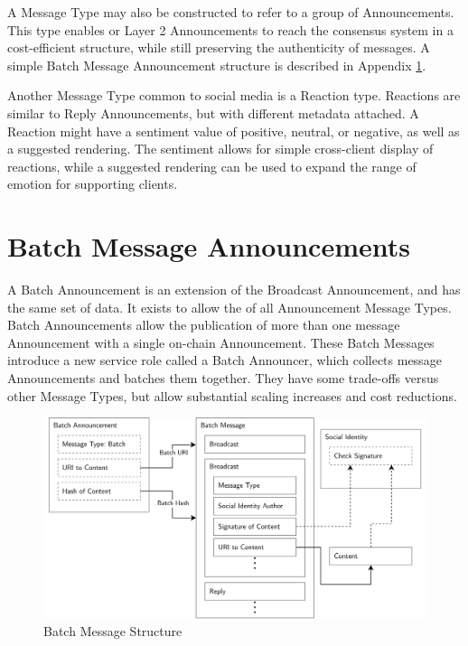 \documentclass[12pt,letterpaper]{article}
\begin{document}
A Message Type may also be constructed to refer to a group of Announcements. This type
enables  or Layer 2 Announcements to reach the consensus system in a
cost-efficient structure, while still preserving the authenticity of messages. A simple
Batch Message Announcement structure is described in Appendix
\ref{app:batch_message_announcements}.

Another Message Type common to social media is a Reaction type. Reactions are similar to
Reply Announcements, but with different metadata attached. A Reaction might have a sentiment
value of positive, neutral, or negative, as well as a suggested rendering. The sentiment
allows for simple cross-client display of reactions, while a suggested rendering can be used
to expand the range of emotion for supporting clients.

	\section{Batch Message Announcements}\label{app:batch_message_announcements}

	A Batch Announcement is an extension of the Broadcast Announcement, and has the same
        set of data. It exists to allow the  of all Announcement Message
        Types. Batch Announcements allow the publication of more than one message
        Announcement with a single on-chain Announcement.  These Batch Messages introduce a
        new service role called a Batch Announcer, which collects message Announcements and
        batches them together. They have some trade-offs versus other Message Types, but
        allow substantial scaling increases and cost reductions.

	\begin{figure}[h]
		\includegraphics[width=\linewidth]{figures/Batch Message Structure.png}
		\caption{Batch Message Structure}
		\label{fig:9}
	\end{figure}
\end{document}
